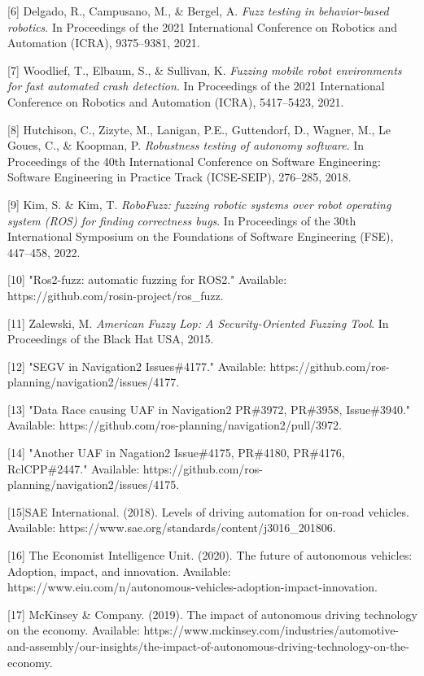 \documentclass[zihao=-4]{ctexart}
\begin{document}
[6] Delgado, R., Campusano, M., \& Bergel, A. \textit{Fuzz testing in behavior-based robotics}. In Proceedings of the 2021 International Conference on Robotics and Automation (ICRA), 9375–9381, 2021.

[7] Woodlief, T., Elbaum, S., \& Sullivan, K. \textit{Fuzzing mobile robot environments for fast automated crash detection}. In Proceedings of the 2021 International Conference on Robotics and Automation (ICRA), 5417–5423, 2021.

[8] Hutchison, C., Zizyte, M., Lanigan, P.E., Guttendorf, D., Wagner, M., Le Goues, C., \& Koopman, P. \textit{Robustness testing of autonomy software}. In Proceedings of the 40th International Conference on Software Engineering: Software Engineering in Practice Track (ICSE-SEIP), 276–285, 2018.

[9] Kim, S. \& Kim, T. \textit{RoboFuzz: fuzzing robotic systems over robot operating system (ROS) for finding correctness bugs}. In Proceedings of the 30th International Symposium on the Foundations of Software Engineering (FSE), 447–458, 2022.

[10] "Ros2-fuzz: automatic fuzzing for ROS2." Available: https://github.com/rosin-project/ros\_fuzz.

[11] Zalewski, M. \textit{American Fuzzy Lop: A Security-Oriented Fuzzing Tool}. In Proceedings of the Black Hat USA, 2015.

[12] "SEGV in Navigation2 Issues\#4177." Available: https://github.com/ros-planning/navigation2/issues/4177.

[13] "Data Race causing UAF in Navigation2 PR\#3972, PR\#3958, Issue\#3940." Available: https://github.com/ros-planning/navigation2/pull/3972.

[14] "Another UAF in Nagation2 Issue\#4175, PR\#4180, PR\#4176, RclCPP\#2447." Available: https://github.com/ros-planning/navigation2/issues/4175.

[15]SAE International. (2018). Levels of driving automation for on-road vehicles. Available: https://www.sae.org/standards/content/j3016\_201806.

[16] The Economist Intelligence Unit. (2020). The future of autonomous vehicles: Adoption, impact, and innovation. Available: https://www.eiu.com/n/autonomous-vehicles-adoption-impact-innovation.

[17] McKinsey \& Company. (2019). The impact of autonomous driving technology on the economy. Available: https://www.mckinsey.com/industries/automotive-and-assembly/our-insights/the-impact-of-autonomous-driving-technology-on-the-economy.
\end{document}

